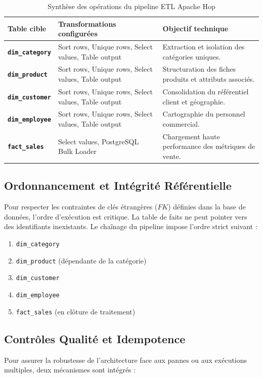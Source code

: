 \documentclass[12pt,a4paper,twoside]{report}
\begin{document}
\begin{table}[H]
\centering
{}
\begin{tabularx}{\textwidth}{>{\bfseries}p{3.1cm}p{5.2cm}X}
\toprule
\rowcolor{TableHeader}
\color{white}Table cible & \color{white}Transformations configurées & \color{white}Objectif technique \\
\midrule
\texttt{dim\_category} & Sort rows, Unique rows, Select values, Table output & Extraction et isolation des catégories uniques. \\
\texttt{dim\_product} & Sort rows, Unique rows, Select values, Table output & Structuration des fiches produits et attributs associés. \\
\texttt{dim\_customer} & Sort rows, Unique rows, Select values, Table output & Consolidation du référentiel client et géographie. \\
\texttt{dim\_employee} & Sort rows, Unique rows, Select values, Table output & Cartographie du personnel commercial. \\
\texttt{fact\_sales} & Select values, PostgreSQL Bulk Loader & Chargement haute performance des métriques de vente. \\
\bottomrule
\end{tabularx}
\caption{Synthèse des opérations du pipeline ETL Apache Hop}
\label{tab:synthese_etl}
\end{table}

\subsection{Ordonnancement et Intégrité Référentielle}
Pour respecter les contraintes de clés étrangères ($FK$) définies dans la base de données, l'ordre d'exécution est critique. La table de faits ne peut pointer vers des identifiants inexistants. Le chaînage du pipeline impose l'ordre strict suivant :
\begin{enumerate}
    \item \texttt{dim\_category}
    \item \texttt{dim\_product} (dépendante de la catégorie)
    \item \texttt{dim\_customer}
    \item \texttt{dim\_employee}
    \item \texttt{fact\_sales} (en clôture de traitement)
\end{enumerate}

\subsection{Contrôles Qualité et Idempotence}
Pour assurer la robustesse de l'architecture face aux pannes ou aux exécutions multiples, deux mécanismes sont intégrés :
\end{document}
